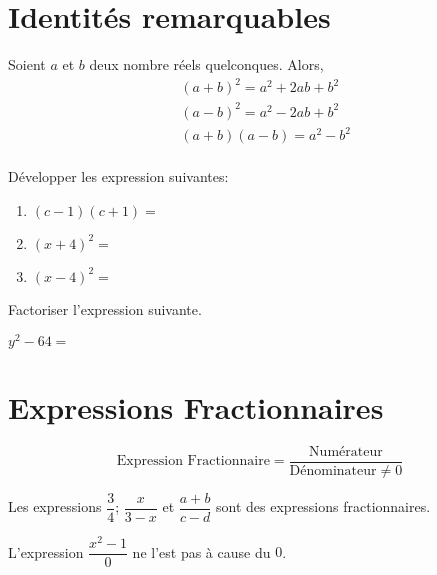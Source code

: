 \documentclass{article}
\begin{document}
\section{Identités remarquables}
\begin{proposition}
Soient $a$ et $b$ deux nombre réels quelconques. Alors,
\begin{equation*}
\begin{aligned}
&(a + b)^2 = a^2 + 2ab + b^2\\ 
&(a - b)^2 = a^2 - 2ab + b^2\\ 
&(a + b)(a - b) = a^2 - b^2\\ 
\end{aligned}
\end{equation*}
\end{proposition}
\begin{example}
Développer les expression suivantes:
\begin{enumerate}[label=\emph{\alph*)}]
\item $(c-1)(c+1)=$ \answersline
\item $(x+4)^2=$ \answersline
\item $(x-4)^2=$ \answersline
\end{enumerate}    
\end{example}
\vspace*{0.5cm}
\begin{example}
Factoriser l'expression suivante. 

$y^2 - 64 =$ \answersline
\end{example}
\newpage
\section{Expressions Fractionnaires}
\begin{tcolorbox}
\begin{definition}
\begin{equation*}
\text{Expression Fractionnaire} = \dfrac{\text{Numérateur}}{\text{Dénominateur} \neq 0}
\end{equation*}
\end{definition}
\end{tcolorbox}
\begin{example}

Les expressions $\dfrac{3}{4}$; $\dfrac{x}{3-x}$ et $\dfrac{a + b}{c - d}$ sont des expressions fractionnaires.

L'expression $\dfrac{x^2 - 1}{0}$ ne l'est pas à cause du $0$.
\end{example}
\end{document}
